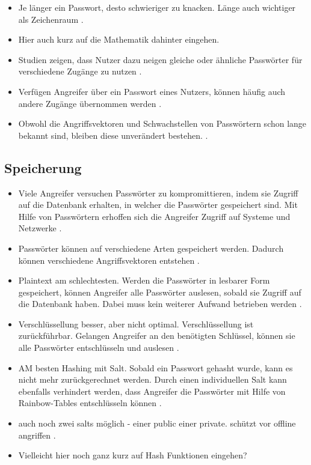 \begin{itemize}
    \item Je länger ein Passwort, desto schwieriger zu knacken. Länge auch wichtiger als Zeichenraum \cite{chanda2016password}.
    \item Hier auch kurz auf die Mathematik dahinter eingehen.
    \item Studien zeigen, dass Nutzer dazu neigen gleiche oder ähnliche Passwörter für verschiedene Zugänge zu nutzen \cite{chanda2016password} \cites{ives2004domino}.
    \item Verfügen Angreifer über ein Passwort eines Nutzers, können häufig auch andere Zugänge übernommen werden \cite{chanda2016password} \cite{morii2017research}.
    \item Obwohl die Angriffsvektoren und Schwachstellen von Passwörtern schon lange bekannt sind, bleiben diese unverändert bestehen. \cite{ives2004domino}.
\end{itemize}

\subsection{Speicherung}

\begin{itemize}
    \item Viele Angreifer versuchen Passwörter zu kompromittieren, indem sie Zugriff auf die Datenbank erhalten, in welcher die Passwörter gespeichert sind. Mit Hilfe von Passwörtern erhoffen sich die Angreifer Zugriff auf Systeme und Netzwerke \cite{boonkrong2012security}.
    \item Passwörter können auf verschiedene Arten gespeichert werden. Dadurch können verschiedene Angriffsvektoren entstehen \cite{chanda2016password}.
    \item Plaintext am schlechtesten. Werden die Passwörter in lesbarer Form gespeichert, können Angreifer alle Passwörter auslesen, sobald sie Zugriff auf die Datenbank haben. Dabei muss kein weiterer Aufwand betrieben werden \cite{chanda2016password}.
    \item Verschlüssellung besser, aber nicht optimal. Verschlüssellung ist zurückführbar. Gelangen Angreifer an den benötigten Schlüssel, können sie alle Passwörter entschlüsseln und auslesen \cite{chanda2016password}.
    \item AM besten Hashing mit Salt. Sobald ein Passwort gehasht wurde, kann es nicht mehr zurückgerechnet werden. Durch einen individuellen Salt kann ebenfalls verhindert werden, dass Angreifer die Passwörter mit Hilfe von Rainbow-Tables entschlüsseln können \cite{chanda2016password}.
    \item auch noch zwei salts möglich - einer public einer private. schützt vor offline angriffen \cite{chanda2016password}.
    \item Vielleicht hier noch ganz kurz auf Hash Funktionen eingehen?
\end{itemize}


